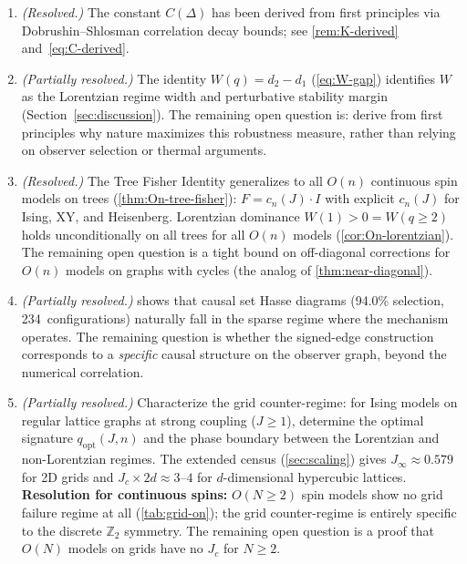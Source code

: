 \documentclass[11pt]{article}
\theoremstyle{definition}
\theoremstyle{remark}
\begin{document}
\begin{enumerate}
  \item \emph{(Resolved.)} The constant $C(\Delta)$ has been derived
    from first principles via Dobrushin--Shlosman correlation decay bounds;
    see \cref{rem:K-derived} and~\eqref{eq:C-derived}.

  \item \emph{(Partially resolved.)} The identity $W(q) = d_2 - d_1$
    (\cref{eq:W-gap}) identifies $W$ as the Lorentzian regime width and
    perturbative stability margin (Section~\ref{sec:discussion}). The
    remaining open question is: derive from first principles why nature
    maximizes this robustness measure, rather than relying on observer
    selection or thermal arguments.

  \item \emph{(Resolved.)} The Tree Fisher Identity generalizes to all
    $O(n)$ continuous spin models on trees (\cref{thm:On-tree-fisher}):
    $F = c_n(J) \cdot I$ with explicit $c_n(J)$ for Ising, XY, and
    Heisenberg. Lorentzian dominance $W(1) > 0 = W(q \geq 2)$ holds
    unconditionally on all trees for all $O(n)$ models
    (\cref{cor:On-lorentzian}). The remaining open question is a tight
    bound on off-diagonal corrections for $O(n)$ models on graphs with
    cycles (the analog of \cref{thm:near-diagonal}).

  \item \emph{(Partially resolved.)}  shows that
    causal set Hasse diagrams (94.0\% selection, 234~configurations)
    naturally fall in the sparse regime where the mechanism operates.
    The remaining question is whether the signed-edge construction
    corresponds to a \emph{specific} causal structure on the observer
    graph, beyond the numerical correlation.

  \item \emph{(Partially resolved.)} Characterize the grid counter-regime:
    for Ising models on regular lattice graphs
    at strong coupling ($J \geq 1$), determine the optimal signature
    $q_{\mathrm{opt}}(J, n)$ and the phase boundary between the Lorentzian
    and non-Lorentzian regimes. The extended census
    (\cref{sec:scaling}) gives $J_\infty \approx 0.579$ for 2D grids
    and $J_c \times 2d \approx 3$--$4$ for $d$-dimensional hypercubic lattices.
    \textbf{Resolution for continuous spins:} $O(N \geq 2)$ spin models
    show no grid failure regime at all (\cref{tab:grid-on}); the grid
    counter-regime is entirely specific to the discrete $\mathbb{Z}_2$
    symmetry. The remaining open question is a proof that $O(N)$ models
    on grids have no $J_c$ for $N \geq 2$.


\end{enumerate}
\end{document}
